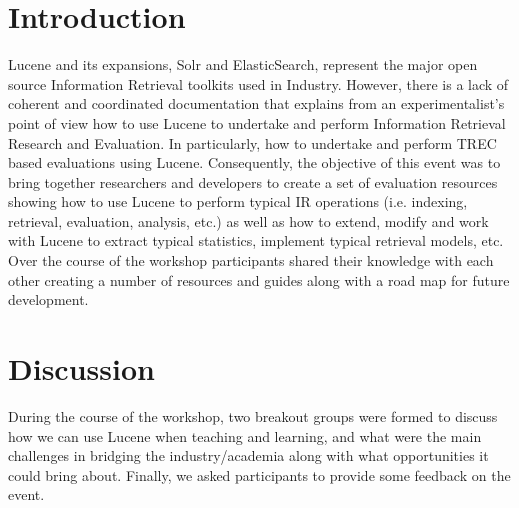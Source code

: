 \documentclass[12pt]{article}
\begin{document}
\begin{sloppypar}
\section{Introduction}
Lucene and its expansions, Solr and ElasticSearch, represent the major open source Information Retrieval toolkits used in Industry. However, there is a lack of coherent and coordinated documentation that explains from an experimentalist's point of view how to use Lucene to undertake and perform Information Retrieval Research and Evaluation. In particularly, how to undertake and perform TREC based evaluations using Lucene. Consequently, the objective of this event was to bring together researchers and developers to create a set of evaluation resources showing how to use Lucene to perform typical IR operations (i.e.  indexing, retrieval, evaluation, analysis, etc.) as well as how to extend, modify and work with Lucene to extract typical statistics, implement typical retrieval models, etc. Over the course of the workshop participants shared their knowledge with each other creating a number of resources and guides along with a road map for future development.






\section{Discussion}
During the course of the workshop, two breakout groups were formed to discuss how we can use Lucene when teaching and learning, and what were the main challenges in bridging the industry/academia along with what opportunities it could bring about. Finally, we asked participants to provide some feedback on the event.




\end{sloppypar}
\end{document}
